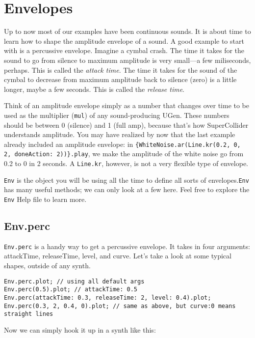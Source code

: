 \section{Envelopes}

Up to now most of our examples have been continuous sounds. It is about time to learn how to shape the amplitude envelope of a sound. A good example to start with is a percussive envelope. Imagine a cymbal crash. The time it takes for the sound to go from silence to maximum amplitude is very small---a few miliseconds, perhaps. This is called the \emph{attack time}. The time it takes for the sound of the cymbal to decrease from maximum amplitude back to silence (zero) is a little longer, maybe a few seconds. This is called the \emph{release time}.

Think of an amplitude envelope simply as a number that changes over time to be used as the multiplier (\texttt{mul}) of any sound-producing UGen. These numbers should be between 0 (silence) and 1 (full amp), because that's how SuperCollider understands amplitude. You may have realized by now that the last example already included an amplitude envelope: in \texttt{\{WhiteNoise.ar(Line.kr(0.2, 0, 2, doneAction: 2))\}.play}, we make the amplitude of the white noise go from 0.2 to 0 in 2 seconds. A \texttt{Line.kr}, however, is not a very flexible type of envelope.

\texttt{Env} is the object you will be using all the time to define all sorts of envelopes.\texttt{Env} has many useful methods; we can only look at a few here. Feel free to explore the \texttt{Env} Help file to learn more.

\subsection{Env.perc}

\texttt{Env.perc} is a handy way to get a percussive envelope. It takes in four arguments: attackTime, releaseTime, level, and curve. Let's take a look at some typical shapes, outside of any synth.

 
\begin{lstlisting}[style=SuperCollider-IDE, basicstyle=\scttfamily\footnotesize]
Env.perc.plot; // using all default args
Env.perc(0.5).plot; // attackTime: 0.5
Env.perc(attackTime: 0.3, releaseTime: 2, level: 0.4).plot;
Env.perc(0.3, 2, 0.4, 0).plot; // same as above, but curve:0 means straight lines
\end{lstlisting}
 

Now we can simply hook it up in a synth like this:

